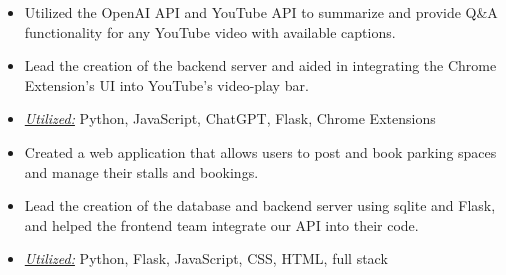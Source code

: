 \divider\small
{}




\begin{itemize}
  \item Utilized the OpenAI API and YouTube API to summarize and provide Q\&A functionality for any YouTube video with available captions.
  \item Lead the creation of the backend server and aided in integrating the Chrome Extension's UI into YouTube's video-play bar.
  \item \underline{\textit{Utilized:}} Python, JavaScript, ChatGPT, Flask, Chrome Extensions
\end{itemize}
\divider\small

\begin{itemize}
  \item Created a web application that allows users to post and book parking spaces and manage their stalls and bookings.
  \item Lead the creation of the database and backend server using sqlite and Flask, and helped the frontend team integrate our API into their code.
  \item \underline{\textit{Utilized:}} Python, Flask, JavaScript, CSS, HTML, full stack 
\end{itemize}
\divider\small

